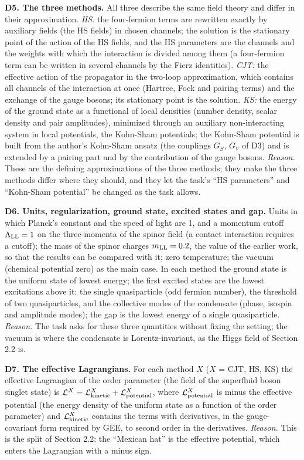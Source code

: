 \documentclass[
  10pt,
]{article}
\begin{document}
\textbf{D5. The three methods.} All three describe the same field theory
and differ in their approximation. \emph{HS:} the four-fermion terms are
rewritten exactly by auxiliary fields (the HS fields) in chosen
channels; the solution is the stationary point of the action of the HS
fields, and the HS parameters are the channels and the weights with
which the interaction is divided among them (a four-fermion term can be
written in several channels by the Fierz identities). \emph{CJT:} the
effective action of the propagator in the two-loop approximation, which
contains all channels of the interaction at once (Hartree, Fock and
pairing terms) and the exchange of the gauge bosons; its stationary
point is the solution. \emph{KS:} the energy of the ground state as a
functional of local densities (number density, scalar density and pair
amplitudes), minimized through an auxiliary non-interacting system in
local potentials, the Kohn-Sham potentials; the Kohn-Sham potential is
built from the author's Kohn-Sham ansatz (the couplings \(G_S\), \(G_V\)
of D3) and is extended by a pairing part and by the contribution of the
gauge bosons. \emph{Reason.} These are the defining approximations of
the three methods; they make the three methods differ where they should,
and they let the task's ``HS parameters'' and ``Kohn-Sham potential'' be
changed as the task allows.

\textbf{D6. Units, regularization, ground state, excited states and
gap.} Units in which Planck's constant and the speed of light are 1, and
a momentum cutoff \(\Lambda_{\rm LL}=1\) on the three-momenta of the
spinor field (a contact interaction requires a cutoff); the mass of the
spinor charges \(m_{\rm LL}=0.2\), the value of the earlier work, so
that the results can be compared with it; zero temperature; the vacuum
(chemical potential zero) as the main case. In each method the ground
state is the uniform state of lowest energy; the first excited states
are the lowest excitations above it: the single quasiparticle (odd
fermion number), the threshold of two quasiparticles, and the collective
modes of the condensate (phase, isospin and amplitude modes); the gap is
the lowest energy of a single quasiparticle. \emph{Reason.} The task
asks for these three quantities without fixing the setting; the vacuum
is where the condensate is Lorentz-invariant, as the Higgs field of
Section 2.2 is.

\textbf{D7. The effective Lagrangians.} For each method \(X\) (\(X\) =
CJT, HS, KS) the effective Lagrangian of the order parameter (the field
of the superfluid boson singlet state) is
\(\mathcal L^X=\mathcal L^X_{\rm kinetic}+\mathcal L^X_{\rm potential}\),
where \(\mathcal L^X_{\rm potential}\) is minus the effective potential
(the energy density of the uniform state as a function of the order
parameter) and \(\mathcal L^X_{\rm kinetic}\) contains the terms with
derivatives, in the gauge-covariant form required by GEE, to second
order in the derivatives. \emph{Reason.} This is the split of Section
2.2: the ``Mexican hat'' is the effective potential, which enters the
Lagrangian with a minus sign.
\end{document}
